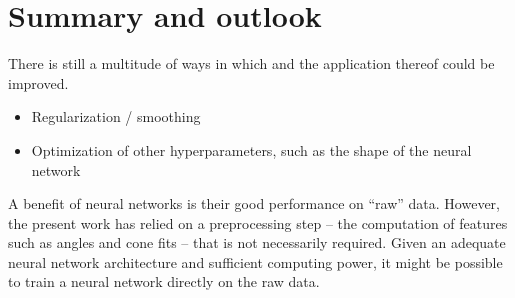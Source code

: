 \chapter{Summary and outlook} \label{sec:summary}

There is still a multitude of ways in which \dsea{} and the application thereof could be improved.
\begin{itemize}
  \item Regularization / smoothing
  \item Optimization of other hyperparameters, such as the shape of the neural network
\end{itemize}

A benefit of neural networks is their good performance on \enquote{raw} data.
However,
the present work has relied on a preprocessing step %
  – the computation of features such as angles and cone fits –
that is not necessarily required.
Given an adequate neural network architecture and sufficient computing power,
it might be possible to train a neural network directly on the raw data.


\blindtext[3]
